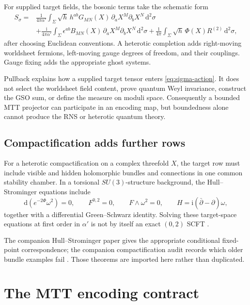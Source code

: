 \documentclass[11pt]{article}
\theoremstyle{definition}
\theoremstyle{remark}
\newcommand{\dd}{\mathrm d}
\begin{document}
For supplied target fields, the bosonic terms take the schematic form
\begin{align}
S_{\sigma}
={}&\frac{1}{4\pi\alpha'}\int_\Sigma
\sqrt{h}\,h^{ab}G_{MN}(X)\,
\partial_aX^M\partial_bX^N\,\dd^2\sigma \nonumber\\
&+\frac{\mathrm i}{4\pi\alpha'}\int_\Sigma
\epsilon^{ab}B_{MN}(X)\,
\partial_aX^M\partial_bX^N\,\dd^2\sigma
+\frac{1}{4\pi}\int_\Sigma
\sqrt{h}\,\Phi(X)R^{(2)}\,\dd^2\sigma ,
\label{eq:sigma-action}
\end{align}
after choosing Euclidean conventions.  A heterotic completion adds
right-moving worldsheet fermions, left-moving gauge degrees of freedom, and
their couplings.  Gauge fixing adds the appropriate ghost systems.

Pullback explains how a supplied target tensor enters
\cref{eq:sigma-action}.  It does not select the worldsheet field content,
prove quantum Weyl invariance, construct the GSO sum, or define the measure
on moduli space.  Consequently a bounded MTT projector can participate in an
encoding map, but boundedness alone cannot produce the RNS or heterotic
quantum theory.

\subsection{Compactification adds further rows}

For a heterotic compactification on a complex threefold \(X\), the target row
must include visible and hidden holomorphic bundles and connections in one
common stability chamber.  In a torsional \(SU(3)\)-structure background,
the Hull--Strominger equations include
\[
\dd(e^{-2\Phi}\omega^2)=0,\qquad
F^{0,2}=0,\qquad F\wedge\omega^2=0,\qquad
H=\mathrm i(\bar\partial-\partial)\omega,
\]
together with a differential Green--Schwarz identity.  Solving these
target-space equations at first order in \(\alpha'\) is not by itself an
exact \((0,2)\) SCFT \cite{Strominger1986,FuYau2008}.

The companion Hull--Strominger paper gives the appropriate conditional
fixed-point correspondence; the companion compactification audit records
which older bundle examples fail \cite{NeroMTTStrominger2026,NeroFluxAudit2026}.
Those theorems are imported here rather than duplicated.

\section{The MTT encoding contract}
\label{sec:map}
\end{document}
